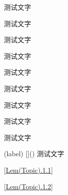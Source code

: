 \begin{Topic}
\begin{Improve}
	\begin{QsNum}
		\item 测试文字
	\end{QsNum}
\end{Improve}

\begin{Thinking}
	\begin{QsNum}
		\item 测试文字
	\end{QsNum}
\end{Thinking}

\begin{Definition}
	测试文字
\end{Definition}

\begin{Lemma}
	测试文字
\end{Lemma}

\begin{Theorem}
	测试文字
\end{Theorem}

\begin{Axiom}
	测试文字
\end{Axiom}


\begin{Proposition}
	测试文字
\end{Proposition}


\begin{Corollary}
	测试文字
\end{Corollary}

\begin{Lemma}
	测试文字
\end{Lemma}


\begin{Lemma*}(label)
	[]()
	测试文字
\end{Lemma*}

\pageref{Lem(Topic).1.1}
\ref{Lem(Topic).1.1}


\pageref{Lem(Topic).1.2}
\ref{Lem(Topic).1.2}

\pageref{label}

\end{Topic}



